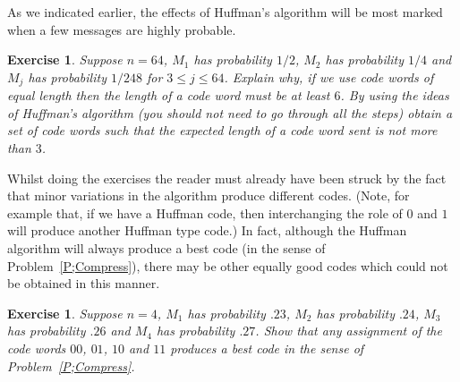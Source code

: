 \documentclass[12pt,a4paper]{article}
\theoremstyle{plain}
\newtheorem{exercise}[theorem]{Exercise}
\theoremstyle{definition}
\begin{document}
As we indicated earlier, the effects of Huffman's algorithm 
will be most marked when a few messages are highly
probable.
\begin{exercise}\label{E;Huffman 2} Suppose $n=64$,
$M_{1}$ has probability $1/2$,
$M_{2}$ has probability $1/4$ and $M_{j}$ has probability
$1/248$ for $3\leq j\leq 64$.
Explain why, if we use code words of equal length
then the length of a code word must be at least $6$.
By using the ideas of Huffman's algorithm (you should not
need to go through all the steps) obtain a set of
code words such that the \emph{expected} length of a code word
sent is not more than $3$.
\end{exercise}

Whilst doing the exercises the reader must already
have been struck by the fact that minor variations
in the algorithm produce different codes. (Note, for example
that, if we have a Huffman code, then interchanging the role of
$0$ and $1$ will produce another Huffman type code.)
In fact, although the Huffman algorithm will always
produce a best code (in the sense of Problem~\ref{P;Compress}),
there may be other equally good codes which could not
be obtained in this manner.
\begin{exercise}\label{E;Huffman 3} Suppose $n=4$,
$M_{1}$ has probability $.23$,
$M_{2}$ has probability $.24$, 
$M_{3}$ has probability $.26$
and $M_{4}$ has probability $.27$. Show that any 
assignment of the code words $00$, $01$, $10$
and $11$ produces a best code in the sense of Problem~\ref{P;Compress}.
\end{exercise}
\end{document}
